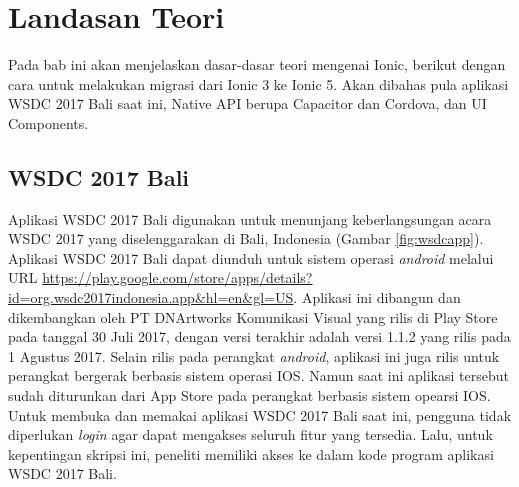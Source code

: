 \setcounter{secnumdepth}{4}
\chapter{Landasan Teori}
\label{chap:teori}

Pada bab ini akan menjelaskan dasar-dasar teori mengenai Ionic, berikut dengan cara untuk melakukan migrasi dari Ionic 3 ke Ionic 5. Akan dibahas pula aplikasi WSDC 2017 Bali saat ini, Native API berupa Capacitor dan Cordova, dan UI Components.

\section{WSDC 2017 Bali}
\label{sec:wsdc2017bali}

Aplikasi WSDC 2017 Bali digunakan untuk menunjang keberlangsungan acara WSDC 2017 yang diselenggarakan di Bali, Indonesia (Gambar \ref{fig:wsdcapp}). Aplikasi WSDC 2017 Bali dapat diunduh untuk sistem operasi {\it android} melalui URL \url{https://play.google.com/store/apps/details?id=org.wsdc2017indonesia.app&hl=en&gl=US}. Aplikasi ini dibangun dan dikembangkan oleh PT DNArtworks Komunikasi Visual yang rilis di Play Store pada tanggal 30 Juli 2017, dengan versi terakhir adalah versi 1.1.2 yang rilis pada 1 Agustus 2017. Selain rilis pada perangkat {\it android}, aplikasi ini juga rilis untuk perangkat bergerak berbasis sistem operasi IOS. Namun saat ini aplikasi tersebut sudah diturunkan dari App Store pada perangkat berbasis sistem opearsi IOS. Untuk membuka dan memakai aplikasi WSDC 2017 Bali saat ini, pengguna tidak diperlukan {\it login} agar dapat mengakses seluruh fitur yang tersedia. Lalu, untuk kepentingan skripsi ini, peneliti memiliki akses ke dalam kode program aplikasi WSDC 2017 Bali.

